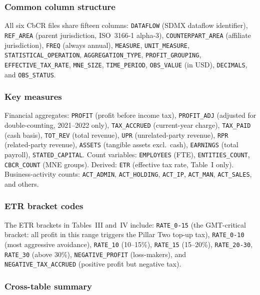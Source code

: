 \documentclass[11pt,a4paper]{article}
\newcommand{\code}[1]{\texttt{#1}}
\begin{document}
\subsubsection{Common column structure}

All six CbCR files share fifteen columns: \code{DATAFLOW} (SDMX dataflow identifier), \code{REF\_AREA} (parent jurisdiction, ISO~3166-1 alpha-3), \code{COUNTERPART\_AREA} (affiliate jurisdiction), \code{FREQ} (always annual), \code{MEASURE}, \code{UNIT\_MEASURE}, \code{STATISTICAL\_OPERATION}, \code{AGGREGATION\_TYPE}, \code{PROFIT\_GROUPING}, \code{EFFECTIVE\_TAX\_RATE}, \code{MNE\_SIZE}, \code{TIME\_PERIOD}, \code{OBS\_VALUE} (in USD), \code{DECIMALS}, and \code{OBS\_STATUS}.

\subsubsection{Key measures}

Financial aggregates: \code{PROFIT} (profit before income tax), \code{PROFIT\_ADJ} (adjusted for double-counting, 2021--2022 only), \code{TAX\_ACCRUED} (current-year charge), \code{TAX\_PAID} (cash basis), \code{TOT\_REV} (total revenue), \code{UPR} (unrelated-party revenue), \code{RPR} (related-party revenue), \code{ASSETS} (tangible assets excl.\ cash), \code{EARNINGS} (total payroll), \code{STATED\_CAPITAL}. Count variables: \code{EMPLOYEES} (FTE), \code{ENTITIES\_COUNT}, \code{CBCR\_COUNT} (MNE groups). Derived: \code{ETR} (effective tax rate, Table~I only). Business-activity counts: \code{ACT\_ADMIN}, \code{ACT\_HOLDING}, \code{ACT\_IP}, \code{ACT\_MAN}, \code{ACT\_SALES}, and others.

\subsubsection{ETR bracket codes}

The ETR brackets in Tables~III and~IV include: \code{RATE\_0-15} (the GMT-critical bracket: all profit in this range triggers the Pillar Two top-up tax), \code{RATE\_0-10} (most aggressive avoidance), \code{RATE\_10} (10--15\%), \code{RATE\_15} (15--20\%), \code{RATE\_20-30}, \code{RATE\_30} (above 30\%), \code{NEGATIVE\_PROFIT} (loss-makers), and \code{NEGATIVE\_TAX\_ACCRUED} (positive profit but negative tax).

\subsubsection{Cross-table summary}
\end{document}
